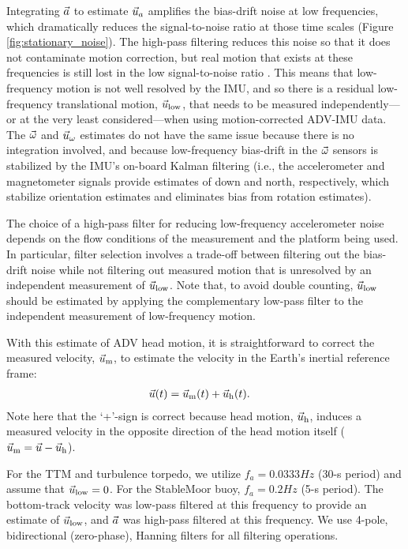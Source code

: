 Integrating ${\vec{a}}$ to estimate $\vec{u}_a$ amplifies the bias-drift noise at low frequencies, which dramatically reduces the signal-to-noise ratio at those time scales (Figure \ref{fig:stationary_noise}).  The high-pass filtering reduces this noise so that it does not contaminate motion correction, but real motion that exists at these frequencies is still lost in the low signal-to-noise ratio \cite[]{EgelandPhD2014, VanZwieten++2015}. This means that low-frequency motion is not well resolved by the IMU, and so there is a residual low-frequency translational motion, $\vec{u}_\mathrm{low}$, that needs to be measured independently---or at the very least considered---when using motion-corrected ADV-IMU data. The $\vec{\omega}$ and $\vec{u}_\omega$ estimates do not have the same issue because there is no integration involved, and because low-frequency bias-drift in the $\vec{\omega}$ sensors is stabilized by the IMU's on-board Kalman filtering (i.e., the accelerometer and magnetometer signals provide estimates of down and north, respectively, which stabilize orientation estimates and eliminates bias from rotation estimates).

The choice of a high-pass filter for reducing low-frequency accelerometer noise depends on the flow conditions of the measurement and the platform being used. In particular, filter selection involves a trade-off between filtering out the bias-drift noise while not filtering out measured motion that is unresolved by an independent measurement of $\vec{u}_\mathrm{low}$. Note that, to avoid double counting, $\vec{u}_\mathrm{low}$ should be estimated by applying the complementary low-pass filter to the independent measurement of low-frequency motion.

With this estimate of ADV head motion, it is straightforward to correct the measured velocity, $\vec{u}_\mathrm{m}$, to estimate the velocity in the Earth's inertial reference frame:
\begin{align}
  \label{eqn:u_mot_def}
  \vec{u}(t) & = \vec{u}_\mathrm{m}(t) + \vec{u}_\mathrm{h}(t).
\end{align}
Note here that the `+'-sign is correct because head motion, $\vec{u}_\mathrm{h}$, induces a measured velocity in the opposite direction of the head motion itself ($\vec{u}_\mathrm{m} = \vec{u} - \vec{u}_\mathrm{h}$).

For the TTM and turbulence torpedo, we utilize $f_a = 0.0333 Hz$ (30-s period) and assume that $\vec{u}_\mathrm{low} = 0$. For the StableMoor buoy, $f_a = 0.2 Hz$ (5-s
period). The bottom-track velocity was low-pass filtered at this frequency to provide an estimate of $\vec{u}_\mathrm{low}$, and ${\vec{a}}$ was high-pass filtered at this frequency. We use 4-pole, bidirectional (zero-phase), Hanning filters for all filtering operations. 

